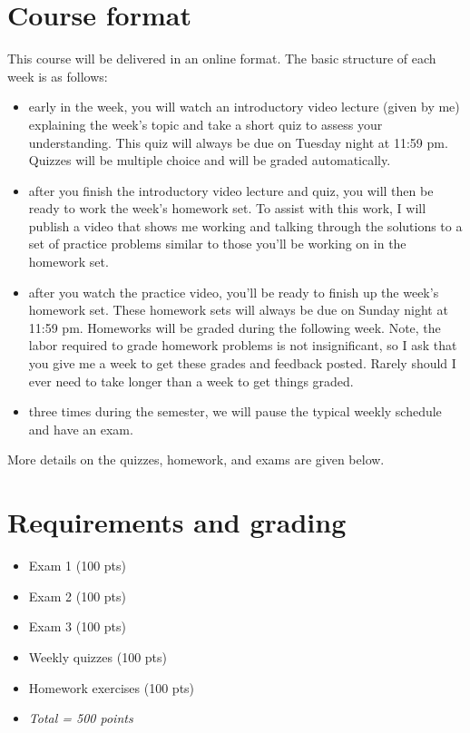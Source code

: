 \documentclass[10pt]{article}
\begin{document}
\section*{Course format}
\label{sec:org40e36a8}

This course will be delivered in an online format. The basic structure of each week is as follows:

\begin{itemize}
\item early in the week, you will watch an introductory video lecture (given by me) explaining the week's topic and take a short quiz to assess your understanding. This quiz will always be due on Tuesday night at 11:59 pm. Quizzes will be multiple choice and will be graded automatically.

\item after you finish the introductory video lecture and quiz, you will then be ready to work the week's homework set. To assist with this work, I will publish a video that shows me working and talking through the solutions to a set of practice problems similar to those you'll be working on in the homework set.

\item after you watch the practice video, you'll be ready to finish up the week's homework set. These homework sets will always be due on Sunday night at 11:59 pm. Homeworks will be graded during the following week. Note, the labor required to grade homework problems is not insignificant, so I ask that you give me a week to get these grades and feedback posted. Rarely should I ever need to take longer than a week to get things graded.

\item three times during the semester, we will pause the typical weekly schedule and have an exam.
\end{itemize}

More details on the quizzes, homework, and exams are given below.

\section*{Requirements and grading}
\label{sec:org84cfd40}
\begin{itemize}
\item Exam 1 (100 pts)
\item Exam 2 (100 pts)
\item Exam 3 (100 pts)
\item Weekly quizzes (100 pts)
\item Homework exercises (100 pts)
\item \emph{Total = 500 points}
\end{itemize}
\end{document}
